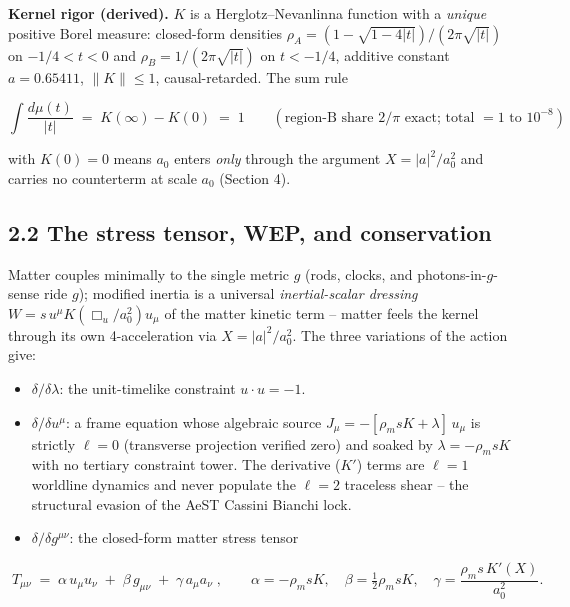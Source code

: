 \documentclass[
]{article}
\providecommand{\tightlist}{%
  \setlength{\itemsep}{0pt}\setlength{\parskip}{0pt}}
\begin{document}
\textbf{Kernel rigor (derived).} \(K\) is a Herglotz--Nevanlinna
function with a \emph{unique} positive Borel measure: closed-form
densities \(\rho_A = (1-\sqrt{1-4|t|})/(2\pi\sqrt{|t|})\) on
\(-1/4 < t < 0\) and \(\rho_B = 1/(2\pi\sqrt{|t|})\) on \(t < -1/4\),
additive constant \(a = 0.65411\), \(\|K\| \le 1\), causal-retarded. The
sum rule

\[ \int \frac{d\mu(t)}{|t|} \;=\; K(\infty) - K(0) \;=\; 1 \qquad (\text{region-B share } 2/\pi \text{ exact; total } = 1 \text{ to } 10^{-8}) \]

with \(K(0)=0\) means \(a_0\) enters \emph{only} through the argument
\(X = |a|^2/a_0^2\) and carries no counterterm at scale \(a_0\) (Section
4).

\subsection{2.2 The stress tensor, WEP, and
conservation}\label{the-stress-tensor-wep-and-conservation}

Matter couples minimally to the single metric \(g\) (rods, clocks, and
photons-in-\(g\)-sense ride \(g\)); modified inertia is a universal
\emph{inertial-scalar dressing} \(W = s\, u^\mu K(\Box_u/a_0^2) u_\mu\)
of the matter kinetic term -- matter feels the kernel through its own
4-acceleration via \(X = |a|^2/a_0^2\). The three variations of the
action give:

\begin{itemize}
\tightlist
\item
  \(\delta/\delta\lambda\): the unit-timelike constraint
  \(u \cdot u = -1\).
\item
  \(\delta/\delta u^\mu\): a frame equation whose algebraic source
  \(J_\mu = -[\rho_m s K + \lambda]\, u_\mu\) is strictly \(\ell = 0\)
  (transverse projection verified zero) and soaked by
  \(\lambda = -\rho_m s K\) with no tertiary constraint tower. The
  derivative (\(K'\)) terms are \(\ell = 1\) worldline dynamics and
  never populate the \(\ell = 2\) traceless shear -- the structural
  evasion of the AeST Cassini Bianchi lock.
\item
  \(\delta/\delta g^{\mu\nu}\): the closed-form matter stress tensor
\end{itemize}

\[ \boxed{\; T_{\mu\nu} \;=\; \alpha\, u_\mu u_\nu \;+\; \beta\, g_{\mu\nu} \;+\; \gamma\, a_\mu a_\nu \;}, \qquad \alpha = -\rho_m s K, \quad \beta = \tfrac{1}{2}\rho_m s K, \quad \gamma = \frac{\rho_m s\, K'(X)}{a_0^2}. \]
\end{document}
